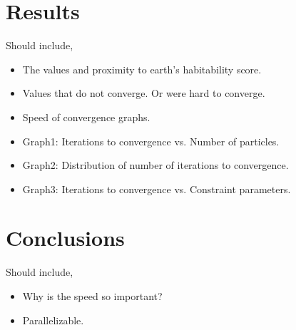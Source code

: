 \documentclass{article}
\newenvironment{pointers}{%
  \noindent Should include,
  \begin{itemize}
    \setlength{\itemsep}{-1pt}}{%
\end{itemize}}
\begin{document}
\section{Results}
\begin{pointers}
\item The values and proximity to earth's habitability score.
\item Values that do not converge. Or were hard to converge.
\item Speed of convergence graphs.
\item Graph1: Iterations to convergence vs. Number of particles.
\item Graph2: Distribution of number of iterations to convergence.
\item Graph3: Iterations to convergence vs. Constraint parameters.
\end{pointers}


\section{Conclusions}
\begin{pointers}
\item Why is the speed so important?
\item Parallelizable.
\end{pointers}
\end{document}
